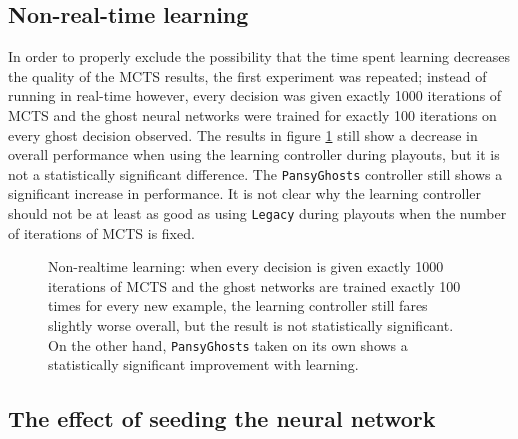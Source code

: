 \subsection{Non-real-time learning}

In order to properly exclude the possibility that the time spent learning decreases the quality of the MCTS results, the first experiment was repeated; instead of running in real-time however, every decision was given exactly 1000 iterations of MCTS and the ghost neural networks were trained for exactly 100 iterations on every ghost decision observed.  The results in figure \ref{fig:resultsrealtime} still show a decrease in overall performance when using the learning controller during playouts, but it is not a statistically significant difference.  The {\tt PansyGhosts} controller still shows a significant increase in performance.  It is not clear why the learning controller should not be at least as good as using {\tt Legacy} during playouts when the number of iterations of MCTS is fixed.

\begin{figure}
\centering
{}
\caption[Non-realtime learning]{Non-realtime learning: when every decision is given exactly 1000 iterations of MCTS and the ghost networks are trained exactly 100 times for every new example, the learning controller still fares slightly worse overall, but the result is not statistically significant.  On the other hand, {\tt PansyGhosts} taken on its own shows a statistically significant improvement with learning.}
\label{fig:resultsrealtime}
\end{figure}


\subsection{The effect of seeding the neural network}

